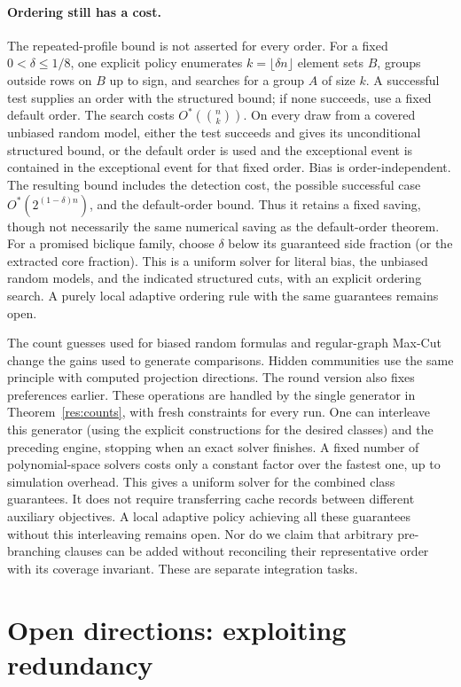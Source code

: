 \documentclass[11pt,a4paper]{article}
\theoremstyle{definition}
\theoremstyle{remark}
\newcommand{\Ostar}{O^{*}}
\begin{document}
\paragraph{Ordering still has a cost.}
The repeated-profile bound is not asserted for every order. For a fixed
$0<\delta\le1/8$, one explicit policy enumerates $k=\lfloor\delta n\rfloor$
element sets $B$, groups outside rows on $B$ up to sign, and searches for a
group $A$ of size $k$. A successful test supplies an order with the
structured bound; if none succeeds, use a fixed default order.
The search costs $\Ostar(\binom nk)$. On every draw from a covered unbiased
random model, either the
test succeeds and gives its unconditional structured bound, or the default
order is used and the exceptional event is contained in the exceptional
event for that fixed order. Bias is order-independent.
The resulting bound includes the detection cost, the possible successful
case $\Ostar(2^{(1-\delta)n})$, and the default-order bound. Thus it retains
a fixed saving, though not necessarily the same numerical saving as the
default-order theorem. For a promised biclique family, choose $\delta$
below its guaranteed side fraction (or the extracted core fraction).
This is a uniform solver for literal bias, the unbiased random models,
and the indicated structured cuts, with an explicit ordering search.
A purely local adaptive ordering rule with the same guarantees remains open.

The count guesses used for biased random formulas and regular-graph
Max-Cut change the gains used to generate comparisons. Hidden communities
use the same principle with computed projection directions. The round
version also fixes preferences earlier. These operations are
handled by the single generator in Theorem~\ref{res:counts}, with fresh
constraints for every run. One can interleave this generator (using the
explicit constructions for the desired classes) and the preceding engine,
stopping when an exact solver finishes. A fixed number of polynomial-space
solvers costs only a constant factor over the fastest one, up to simulation
overhead. This gives a uniform solver for the combined class guarantees.
It does not require transferring cache records between different auxiliary
objectives. A local adaptive policy achieving all these guarantees without
this interleaving remains open.
Nor do we claim that arbitrary
pre-branching clauses can be added without reconciling their representative
order with its coverage invariant. These are separate integration tasks.

\section{Open directions: exploiting redundancy}
\label{sec:open}
\end{document}
